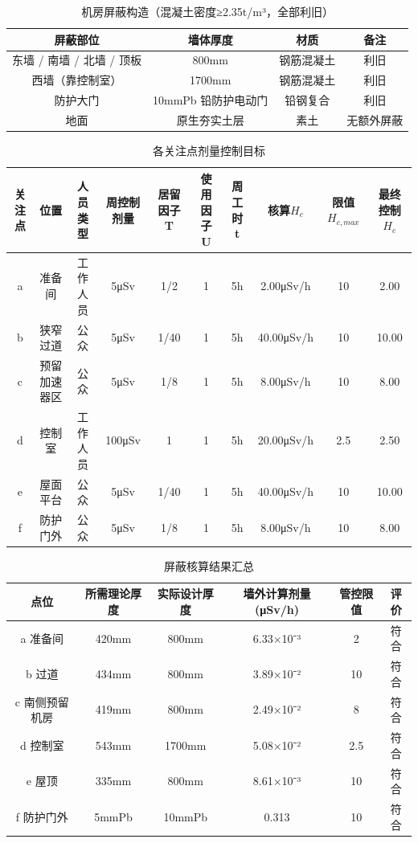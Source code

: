 \begin{table}[H]
\centering
\caption{机房屏蔽构造（混凝土密度≥2.35t/m³，全部利旧）}
\begin{tabular}{|c|c|c|c|}
\hline
屏蔽部位 & 墙体厚度 & 材质 & 备注 \\
\hline
东墙 / 南墙 / 北墙 / 顶板 & 800mm & 钢筋混凝土 & 利旧 \\
\hline
西墙（靠控制室） & 1700mm & 钢筋混凝土 & 利旧 \\
\hline
防护大门 & 10mmPb 铅防护电动门 & 铅钢复合 & 利旧 \\
\hline
地面 & 原生夯实土层 & 素土 & 无额外屏蔽 \\
\hline
\end{tabular}
\end{table}



\begin{table}[H]
\centering
\caption{各关注点剂量控制目标}
\begin{tabular}{|c|c|c|c|c|c|c|c|c|c|}
\hline
关注点 & 位置 & 人员类型 & 周控制剂量 & 居留因子 T & 使用因子 U & 周工时 t & 核算$H_c$ & 限值$H_{c,max}$ & 最终控制$H_c$ \\
\hline
a & 准备间 & 工作人员 & 5μSv & 1/2 & 1 & 5h & 2.00μSv/h & 10 & 2.00 \\
\hline
b & 狭窄过道 & 公众 & 5μSv & 1/40 & 1 & 5h & 40.00μSv/h & 10 & 10.00 \\
\hline
c & 预留加速器区 & 公众 & 5μSv & 1/8 & 1 & 5h & 8.00μSv/h & 10 & 8.00 \\
\hline
d & 控制室 & 工作人员 & 100μSv & 1 & 1 & 5h & 20.00μSv/h & 2.5 & 2.50 \\
\hline
e & 屋面平台 & 公众 & 5μSv & 1/40 & 1 & 5h & 40.00μSv/h & 10 & 10.00 \\
\hline
f & 防护门外 & 公众 & 5μSv & 1/8 & 1 & 5h & 8.00μSv/h & 10 & 8.00 \\
\hline
\end{tabular}
\end{table}



\begin{table}[H]
\centering
\caption{屏蔽核算结果汇总}
\begin{tabular}{|c|c|c|c|c|c|}
\hline
点位 & 所需理论厚度 & 实际设计厚度 & 墙外计算剂量 (μSv/h) & 管控限值 & 评价 \\
\hline
a 准备间 & 420mm & 800mm & 6.33×10⁻³ & 2 & 符合 \\
\hline
b 过道 & 434mm & 800mm & 3.89×10⁻² & 10 & 符合 \\
\hline
c 南侧预留机房 & 419mm & 800mm & 2.49×10⁻² & 8 & 符合 \\
\hline
d 控制室 & 543mm & 1700mm & 5.08×10⁻² & 2.5 & 符合 \\
\hline
e 屋顶 & 335mm & 800mm & 8.61×10⁻³ & 10 & 符合 \\
\hline
f 防护门外 & 5mmPb & 10mmPb & 0.313 & 10 & 符合 \\
\hline
\end{tabular}
\end{table}


